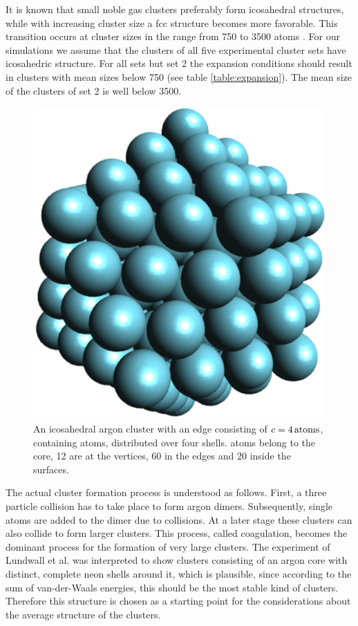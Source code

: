 It is known that small noble gas clusters preferably form icosahedral structures,
while with increasing cluster size a fcc structure becomes more favorable. This transition
occurs at cluster sizes in the range from 750 to 3500 atoms \cite{Martin96,Doye97,Hartke02}.
For our simulations we assume that the clusters of all five experimental cluster sets have 
icosahedric structure. For all sets but set 2 the expansion conditions should result in clusters 
with mean sizes below 750 (see table \ref{table:expansion}). The mean size of the clusters of set 2 is well below 3500.

\begin{figure}[!ht]
 \centering
 \includegraphics[scale=0.5]{pics/Ar_pure.eps}                        
 \caption{An icosahedral argon cluster with an edge consisting of 
          $c=\unit[4]{atoms}$, containing \unit[147]{atoms},
          distributed over four shells. \unit[55]{atoms} belong
          to the core, 12 are at the vertices, 60 in the edges and 20 inside the
          surfaces.}
 \label{figure:Ar_pure}
\end{figure}    

The actual cluster formation process is understood as follows. First, a three particle
collision has to take place to form argon dimers. Subsequently, single atoms are added to the dimer 
due to collisions. At a later stage these clusters can also collide to form larger clusters. This process,
called coagulation, becomes the dominant process for the formation of very large clusters. 
The experiment of Lundwall et al. \cite{Lundwall07} was interpreted to
show clusters consisting of an argon core with distinct, complete neon
shells around it, which is plausible, since according to the sum of van-der-Waals
energies, this should be the most stable kind of clusters.
Therefore this structure is chosen as a starting point for the considerations
about the average structure of the clusters.

